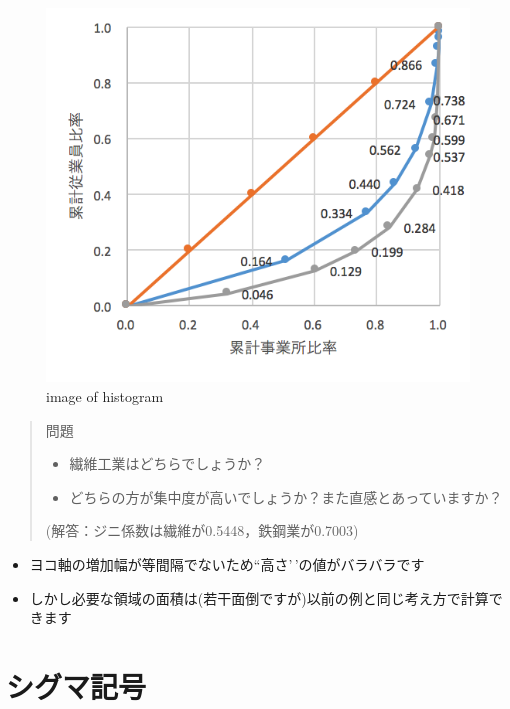 \documentclass[
]{book}
\providecommand{\tightlist}{%
  \setlength{\itemsep}{0pt}\setlength{\parskip}{0pt}}
\theoremstyle{definition}
\theoremstyle{definition}
\theoremstyle{definition}
\theoremstyle{definition}
\theoremstyle{remark}
\begin{document}
\begin{figure}
\centering
\includegraphics[width=1\textwidth,height=\textheight]{images/lec04/fig_textile_steel.png}
\caption{image of histogram}
\end{figure}

\begin{quote}
問題

\begin{itemize}
\tightlist
\item
  繊維工業はどちらでしょうか？
\item
  どちらの方が集中度が高いでしょうか？また直感とあっていますか？
\end{itemize}

(解答：ジニ係数は繊維が0.5448，鉄鋼業が0.7003)
\end{quote}

\begin{itemize}
\tightlist
\item
  ヨコ軸の増加幅が等間隔でないため``高さ'\,'の値がバラバラです
\item
  しかし必要な領域の面積は(若干面倒ですが)以前の例と同じ考え方で計算できます
\end{itemize}

\hypertarget{ux30b7ux30b0ux30deux8a18ux53f7}{%
\section{シグマ記号}\label{ux30b7ux30b0ux30deux8a18ux53f7}}
\end{document}
